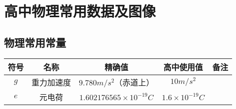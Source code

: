
\chapter{高中物理常用数据及图像}

\section{物理常用常量}

\begin{center}
\begin{tabular}{c|c|c|c|c}
\textbf{符号} & \textbf{名称} & \textbf{精确值} & \textbf{高中使用值} & \textbf{备注} \\
\hline
$g$ & 重力加速度 & $9.780 m/s^2$（赤道上） & $10m/s^2$ & \\
$e$ & 元电荷 & $1.602176565 \times 10^{-19} C$ & $1.6 \times 10^{-19} C$ & \\ 
\end{tabular}
\end{center}

